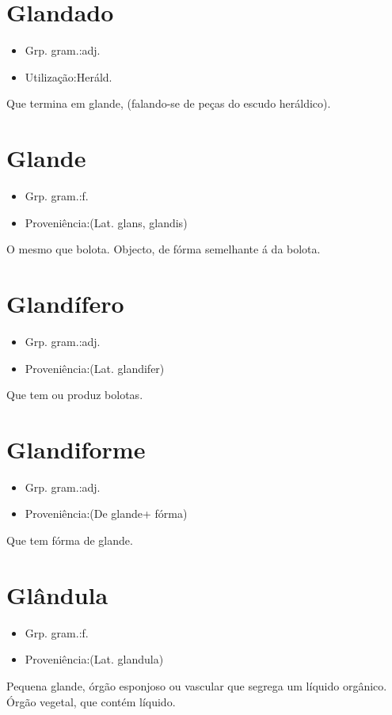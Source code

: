 \section{Glandado}
\begin{itemize}
\item {Grp. gram.:adj.}
\end{itemize}
\begin{itemize}
\item {Utilização:Heráld.}
\end{itemize}
Que termina em glande, (falando-se de peças do escudo heráldico).
\section{Glande}
\begin{itemize}
\item {Grp. gram.:f.}
\end{itemize}
\begin{itemize}
\item {Proveniência:(Lat. \textunderscore glans\textunderscore , \textunderscore glandis\textunderscore )}
\end{itemize}
O mesmo que \textunderscore bolota\textunderscore .
Objecto, de fórma semelhante á da bolota.
\section{Glandífero}
\begin{itemize}
\item {Grp. gram.:adj.}
\end{itemize}
\begin{itemize}
\item {Proveniência:(Lat. \textunderscore glandifer\textunderscore )}
\end{itemize}
Que tem ou produz bolotas.
\section{Glandiforme}
\begin{itemize}
\item {Grp. gram.:adj.}
\end{itemize}
\begin{itemize}
\item {Proveniência:(De \textunderscore glande\textunderscore  + \textunderscore fórma\textunderscore )}
\end{itemize}
Que tem fórma de glande.
\section{Glândula}
\begin{itemize}
\item {Grp. gram.:f.}
\end{itemize}
\begin{itemize}
\item {Proveniência:(Lat. \textunderscore glandula\textunderscore )}
\end{itemize}
Pequena glande, órgão esponjoso ou vascular que segrega um líquido orgânico.
Órgão vegetal, que contém líquido.
